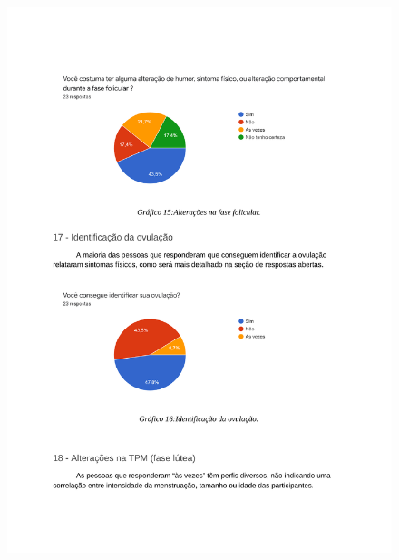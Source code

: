 \begin{apendicesenv}
    \begin{figure}[h]
        \centering
        \includegraphics[keepaspectratio=true,scale=0.7]{figuras/Tab13.pdf}
    \end{figure}
    

\end{apendicesenv}
